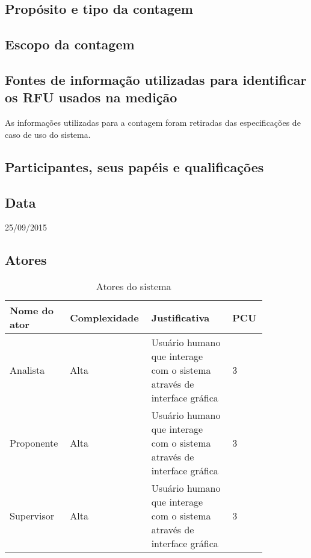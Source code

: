\subsection{Propósito e tipo da contagem}

\subsection{Escopo da contagem}

\subsection{Fontes de informação utilizadas para identificar os RFU usados na medição}
As informações utilizadas para a contagem foram retiradas das especificações de caso de uso do sistema.

\subsection{Participantes, seus papéis e qualificações}

\subsection{Data}
25/09/2015

\subsection{Atores}

\begin{table*}[!h]
\centering
\caption{Atores do sistema}
\label{Rotulo}
  \begin{tabular}{|p{0.20\linewidth}|p{0.25\linewidth}|p{0.30\linewidth}|p{0.10\linewidth}|}
  \hline
  \textbf{Nome do ator} & \textbf{Complexidade} & \textbf{Justificativa} & \textbf{PCU} \\ 
  \hline

  Analista & Alta & Usuário humano que interage com o sistema através de interface gráfica & 3 \\
  \hline
  Proponente & Alta & Usuário humano que interage com o sistema através de interface gráfica & 3\\
  \hline
  Supervisor & Alta & Usuário humano que interage com o sistema através de interface gráfica & 3\\
  \hline
  \end{tabular}
\end{table*}


